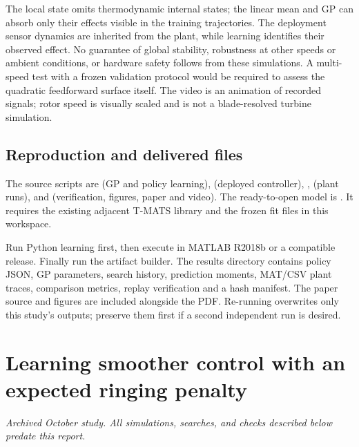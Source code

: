The local state omits thermodynamic internal states; the linear mean and GP can absorb only their effects visible in the training trajectories. The deployment sensor dynamics are inherited from the plant, while learning identifies their observed effect. No guarantee of global stability, robustness at other speeds or ambient conditions, or hardware safety follows from these simulations. A multi-speed test with a frozen validation protocol would be required to assess the quadratic feedforward surface itself. The video is an animation of recorded signals; rotor speed is visually scaled and is not a blade-resolved turbine simulation.

\subsection{Reproduction and delivered files}
The source scripts are  (GP and policy learning),  (deployed controller), ,  (plant runs), and  (verification, figures, paper and video). The ready-to-open model is . It requires the existing adjacent T-MATS library and the frozen fit files in this workspace.

Run Python learning first, then execute  in MATLAB R2018b or a compatible release. Finally run the artifact builder. The results directory contains policy JSON, GP parameters, search history, prediction moments, MAT/CSV plant traces, comparison metrics, replay verification and a hash manifest. The paper source and figures are included alongside the PDF. Re-running overwrites only this study's outputs; preserve them first if a second independent run is desired.



\section{Learning smoother control with an expected ringing penalty}
\textit{Archived October study. All simulations, searches, and checks described below predate this report.}\par

